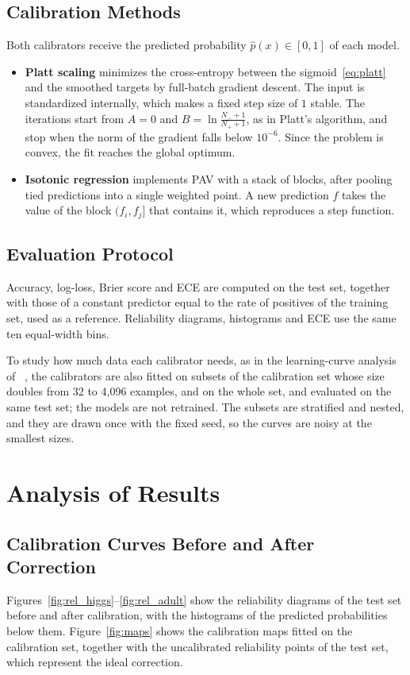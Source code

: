 \documentclass[a4paper, 10pt]{article}
\begin{document}
\subsection{Calibration Methods}\label{sec:calibrators}
Both calibrators receive the predicted probability $\hat{p}(x) \in [0, 1]$ of each model. 
\begin{itemize}
  \item \textbf{Platt scaling} minimizes the cross-entropy between the sigmoid~\eqref{eq:platt} and the smoothed targets by full-batch gradient descent. The input is standardized internally, which makes a fixed step size of $1$ stable. The iterations start from $A = 0$ and $B = \ln\frac{N_- + 1}{N_+ + 1}$, as in Platt's algorithm, and stop when the norm of the gradient falls below $10^{-6}$. Since the problem is convex, the fit reaches the global optimum.
  \item \textbf{Isotonic regression} implements PAV with a stack of blocks, after pooling tied predictions into a single weighted point. A new prediction $f$ takes the value of the block $(f_i, f_j]$ that contains it, which reproduces a step function.
\end{itemize}

\subsection{Evaluation Protocol}\label{sec:protocol}
Accuracy, log-loss, Brier score and ECE are computed on the test set, together with those of a constant predictor equal to the rate of positives of the training set, used as a reference. Reliability diagrams, histograms and ECE use the same ten equal-width bins.

To study how much data each calibrator needs, as in the learning-curve analysis of ~\cite{niculescu2005predicting}, the calibrators are also fitted on subsets of the calibration set whose size doubles from 32 to 4,096 examples, and on the whole set, and evaluated on the same test set; the models are not retrained. The subsets are stratified and nested, and they are drawn once with the fixed seed, so the curves are noisy at the smallest sizes.


\section{Analysis of Results}\label{sec:results}
\subsection{Calibration Curves Before and After Correction}\label{sec:curves}
Figures~\ref{fig:rel_higgs}--\ref{fig:rel_adult} show the reliability diagrams of the test set before and after calibration, with the histograms of the predicted probabilities below them. Figure~\ref{fig:maps} shows the calibration maps fitted on the calibration set, together with the uncalibrated reliability points of the test set, which represent the ideal correction.
\end{document}
